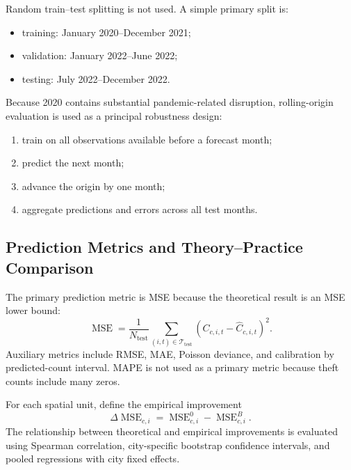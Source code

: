 \documentclass[applsci,article,submit,moreauthors]{Definitions/mdpi}
\begin{document}
Random train--test splitting is not used. A simple primary split is:
\begin{itemize}
    \item training: January 2020--December 2021;
    \item validation: January 2022--June 2022;
    \item testing: July 2022--December 2022.
\end{itemize}
Because 2020 contains substantial pandemic-related disruption, rolling-origin evaluation is used as a principal robustness design:
\begin{enumerate}
    \item train on all observations available before a forecast month;
    \item predict the next month;
    \item advance the origin by one month;
    \item aggregate predictions and errors across all test months.
\end{enumerate}

\subsection{Prediction Metrics and Theory--Practice Comparison}
\label{subsec:metrics}

The primary prediction metric is MSE because the theoretical result is an MSE lower bound:
\begin{equation}
\operatorname{MSE}
=
\frac{1}{N_{\mathrm{test}}}
\sum_{(i,t)\in\mathcal{T}_{\mathrm{test}}}
\left(C_{c,i,t}-\widehat{C}_{c,i,t}\right)^2.
\end{equation}
Auxiliary metrics include RMSE, MAE, Poisson deviance, and calibration by predicted-count interval. MAPE is not used as a primary metric because theft counts include many zeros.

For each spatial unit, define the empirical improvement
\begin{equation}
\Delta\operatorname{MSE}_{c,i}
=
\operatorname{MSE}^{0}_{c,i}-\operatorname{MSE}^{B}_{c,i}.
\label{eq:mse_improvement}
\end{equation}
The relationship between theoretical and empirical improvements is evaluated using Spearman correlation, city-specific bootstrap confidence intervals, and pooled regressions with city fixed effects.
\end{document}
